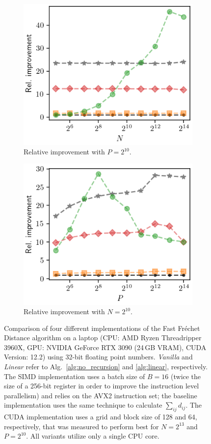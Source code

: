 \begin{figure}[htbp]
\begin{subfigure}{.49\textwidth}
        \includegraphics[width=.8\textwidth]{img/desktop/rel_performance-N.png}
        \caption{Relative improvement with $P = 2^{10}$.}
    \end{subfigure}
    \begin{subfigure}{.49\textwidth}
        \includegraphics[width=.8\textwidth]{img/desktop/rel_performance-pP.png}
        \caption{Relative improvement with $N = 2^{10}$.}
    \end{subfigure}
    \caption{Comparison of four different implementations of the Fast Fr\'echet Distance algorithm on a laptop (CPU: AMD Ryzen Threadripper 3960X, GPU: NVIDIA GeForce RTX 3090 (24\,GB VRAM), CUDA Version: 12.2) using 32-bit floating point numbers. \textit{Vanilla} and \textit{Linear} refer to Alg.~\ref{alg:no_recursion} and \ref{alg:linear}, respectively. The SIMD implementation uses a batch size of $B = 16$ (twice the size of a 256-bit register in order to improve the instruction level parallelism) and relies on the AVX2 instruction set; the baseline implementation uses the same technique to calculate $\sum_{ij} d_{ij}$. The CUDA implementation uses a grid and block size of 128 and 64, respectively, that was measured to perform best for $N=2^{13}$ and $P=2^{10}$. All variants utilize only a single CPU core.}
    \label{fig:benchmark_desktop}
\end{figure}
